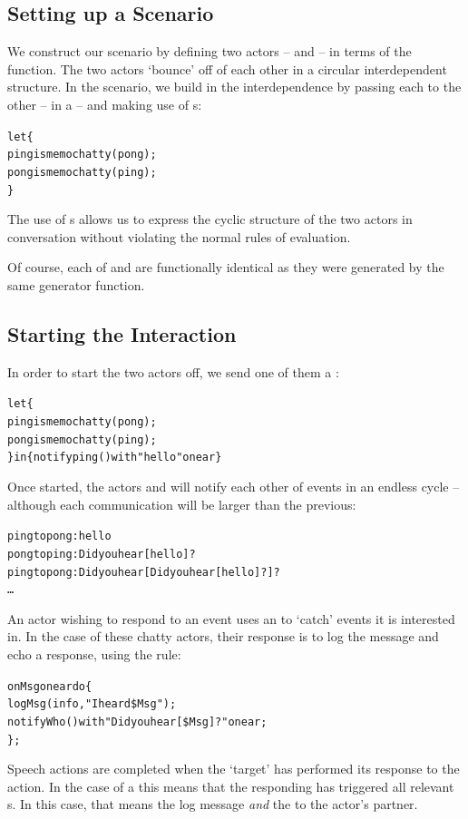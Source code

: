 \subsection{Setting up a Scenario}
We construct our scenario by defining two actors --  and  -- in terms of the  function. The two actors `bounce' off of each other in a circular interdependent structure. In the scenario, we build in the interdependence by passing each  to the other -- in a  -- and making use of s:
\begin{alltt}
let\{
  ping is memo chatty(pong);
  pong is memo chatty(ping);
\}
\end{alltt}
\begin{aside}
The use of s allows us to express the cyclic structure of the two actors in conversation without violating the normal rules of evaluation.
\end{aside}
Of course, each of  and  are functionally identical as they were generated by the same generator function.

\subsection{Starting the Interaction}
In order to start the two actors off, we send one of them a  :
\begin{alltt}
let\{
  ping is memo chatty(pong);
  pong is memo chatty(ping);
\} in \{ notify ping() with "hello" on ear \}
\end{alltt}

Once started, the actors  and  will notify each other of events in an endless cycle -- although each communication will be larger than the previous:
\begin{alltt}
ping {\rm{}to} pong: hello
pong {\rm{}to} ping: Did you hear [hello]?
ping {\rm{}to} pong: Did you hear [Did you hear [hello]?]?
\ldots
\end{alltt}

An actor wishing to respond to an event uses an  to `catch' events it is interested in. In the case of these chatty actors, their response is to log the message and echo a response, using the rule:
\begin{alltt}
on Msg on ear do\{
   logMsg(info,"I heard \$Msg");
   notify Who() with "Did you hear [\$Msg]?" on ear;
\};
\end{alltt}
Speech actions are completed when the `target'  has performed its response to the action. In the case of a  this means that the responding  has triggered all relevant s. In this case, that means the log message \emph{and} the  to the actor's partner.


